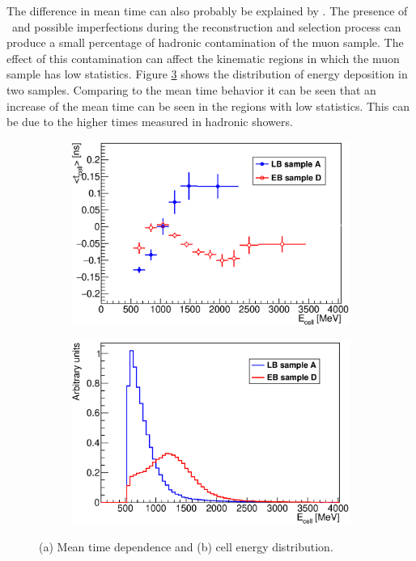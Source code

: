The difference in mean time can also probably be explained by \pileup.
The presence of \pileup\ and possible imperfections during the reconstruction and selection process can produce a small percentage of hadronic contamination of the muon sample.
The effect of this contamination can affect the kinematic regions in which the muon sample has low statistics.
Figure \ref{fig:muon_dist} shows the distribution of energy deposition in two samples.
Comparing to the mean time behavior it can be seen that an increase of the mean time can be seen in the regions with low statistics.
This can be due to the higher times measured in hadronic showers.

\begin{figure}[tb!]
  \begin{center}
    \begin{subfigure}{0.49\textwidth}
      \includegraphics[width=\textwidth]{TileTimingPerformance/Figures/gmean.eps}
      \caption{}
      \label{fig:gmean}
    \end{subfigure}
    \begin{subfigure}{0.49\textwidth}
      \includegraphics[width=\textwidth]{TileTimingPerformance/Figures/muondist.eps}
      \caption{}
      \label{fig:muondist}
    \end{subfigure}
  \end{center}
  \caption{(a) Mean time dependence and (b) cell energy distribution.}
  \label{fig:muon_dist}
\end{figure}


